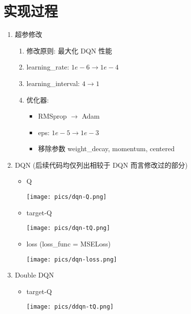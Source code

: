 \documentclass[a4paper,12pt]{article}
\begin{document}
\section{实现过程}
\begin{enumerate}
    \item 超参修改
    \begin{enumerate}[(1)]
        \item 修改原则: 最大化 DQN 性能
        \item learning\_rate: $1e-6\to 1e-4$
        \item learning\_interval: $4\to 1$
        \item 优化器:
        \begin{itemize}
            \item RMSprop $\to$ Adam
            \item eps: $1e-5\to 1e-3$
            \item 移除参数 weight\_decay, momentum, centered
        \end{itemize}
    \end{enumerate}
    \newpage
    \item DQN (后续代码均仅列出相较于 DQN 而言修改过的部分)
    \begin{itemize}
        \item Q
        \begin{figure*}[h!]
            \centering
            \texttt{[image: pics/dqn-Q.png]}
        \end{figure*}
        \item target-Q
        \begin{figure*}[h!]
            \centering
            \texttt{[image: pics/dqn-tQ.png]}
        \end{figure*}
        \item loss (loss\_func = MSELoss)
        \begin{figure*}[h!]
            \centering
            \texttt{[image: pics/dqn-loss.png]}
        \end{figure*}
    \end{itemize}
    \item Double DQN
    \begin{itemize}
        \item target-Q
        \begin{figure*}[h!]
            \centering
            \texttt{[image: pics/ddqn-tQ.png]}
        \end{figure*}
    \end{itemize}

\end{enumerate}
\end{document}
